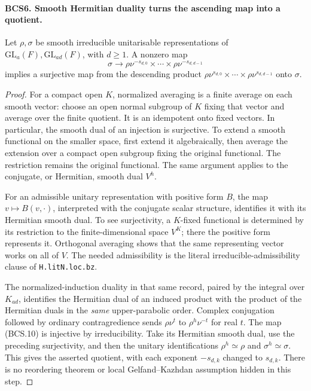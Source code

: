 \documentclass[11pt,a4paper]{article}
\numberwithin{equation}{section}
\theoremstyle{remark}\newtheorem{remark}[theorem]{Remark}
\begin{document}
\paragraph{BCS6. Smooth Hermitian duality turns the ascending map into a quotient.}
\label{claim:BCS6}
Let \(\rho,\sigma\) be smooth irreducible unitarisable
representations of \(\mathrm{GL}_a(F),\mathrm{GL}_{ad}(F)\), with
\(d\ge1\).  A nonzero map
\[
 \sigma\longrightarrow
       \rho\nu^{-s_{d,0}}\times\cdots\times\rho\nu^{-s_{d,d-1}}
 \tag{BCS.10}
\]
implies a surjective map from the descending product
\(\rho\nu^{s_{d,0}}\times\cdots\times\rho\nu^{s_{d,d-1}}\)
onto \(\sigma\).
\begin{proof}
For a compact open \(K\), normalized averaging is a finite average
on each smooth vector: choose an open normal subgroup of \(K\)
fixing that vector and average over the finite quotient.  It is an
idempotent onto fixed vectors.  In particular, the smooth dual of an
injection is surjective.  To extend a smooth functional on the smaller
space, first extend it algebraically, then average the extension over
a compact open subgroup fixing the original functional.  The
restriction remains the original functional.  The same argument
applies to the conjugate, or Hermitian, smooth dual \(V^h\).

For an admissible unitary representation with positive form \(B\),
the map \(v\mapsto B(v,\cdot)\), interpreted with the conjugate
scalar structure, identifies it with its Hermitian smooth dual.  To
see surjectivity, a \(K\)-fixed functional is determined by its
restriction to the finite-dimensional space \(V^K\); there the
positive form represents it.  Orthogonal averaging shows that the
same representing vector works on all of \(V\).  The needed
admissibility is the literal irreducible-admissibility clause of
\texttt{H.\allowbreak lit\allowbreak N.\allowbreak loc.\allowbreak bz}.

The normalized-induction duality in that same record, paired by the
integral over \(K_{ad}\), identifies the Hermitian dual of an induced
product with the product of the Hermitian duals in the \emph{same}
upper-parabolic order.  Complex conjugation followed by ordinary
contragredience sends \(\rho\nu^t\) to
\(\rho^h\nu^{-t}\) for real \(t\).
The map (BCS.10) is injective by irreducibility.  Take its Hermitian
smooth dual, use the preceding surjectivity, and then the unitary
identifications \(\rho^h\simeq\rho\) and
\(\sigma^h\simeq\sigma\).  This gives the asserted quotient,
with each exponent \(-s_{d,k}\) changed to \(s_{d,k}\).
There is no reordering theorem or local Gelfand--Kazhdan assumption
hidden in this step.
\end{proof}
\end{document}
